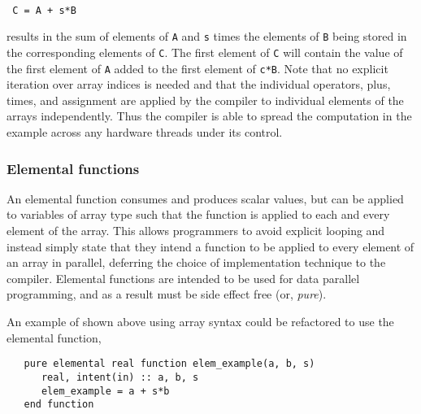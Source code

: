 \begin{verbatim}

 C = A + s*B

\end{verbatim}

results in the sum of elements of {\tt A} and {\tt s} times the elements of
{\tt B} being stored in the corresponding elements of {\tt C}. The first
element of {\tt C} will contain the value of the first element of {\tt A}
added to the first element of {\tt c*B}.  Note that no explicit iteration over
array indices is needed and that the individual operators, plus, times, and
assignment are applied by the compiler to individual elements of the arrays
independently.  Thus the compiler is able to spread the computation in the
example across any hardware threads under its control.


\subsubsection*{Elemental functions}

An elemental function consumes and produces scalar values, but can be applied
to variables of array type such that the function is applied to each and every
element of the array.  This allows programmers to avoid explicit looping and
instead simply state that they intend a function to be applied to every
element of an array in parallel, deferring the choice of implementation
technique to the compiler.  Elemental functions are intended to be used for
data parallel programming, and as a result must be side effect free (or,
\emph{pure}).


An example of shown above using array syntax could be refactored to use
the elemental function,

\begin{verbatim}
   pure elemental real function elem_example(a, b, s)
      real, intent(in) :: a, b, s
      elem_example = a + s*b
   end function
\end{verbatim}


